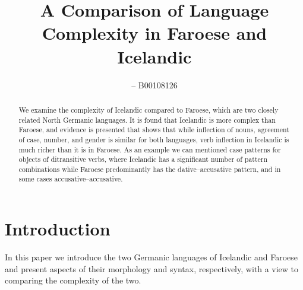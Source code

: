 \documentclass[12pt,%
    times,
]{lin-v2/lin}
\begin{document}
\leftrunning{}  %

\rightrunning{} %

\title{A Comparison of Language Complexity in Faroese and Icelandic}

\author[1]{  -- B00108126}

\address[1]
{%
  , %
  , %
  , %
}

\maketitle

\begin{abstract}
    We examine the complexity of Icelandic compared to Faroese, which are two closely related North Germanic languages.
    It is found that Icelandic is more complex than Faroese, and evidence is presented that shows
    that while inflection of nouns, agreement of case, number, and gender is similar for both languages,
    verb inflection in Icelandic is much richer than it is in Faroese. As an example we can mentioned
    case patterns for objects of ditransitive verbs, where Icelandic has a significant number of pattern
    combinations while Faroese predominantly has the dative--accusative pattern, and in some cases
    accusative--accusative.
\end{abstract}

\section{Introduction}

In this paper we introduce the two Germanic languages of Icelandic and Faroese and present aspects of their morphology
and syntax, respectively, with a view to comparing the complexity of the two.

\end{document}

